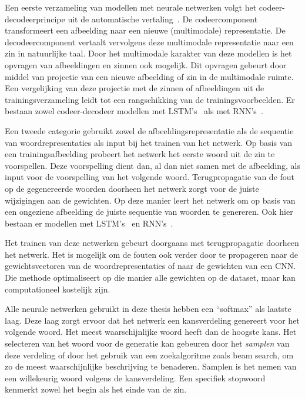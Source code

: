 Een eerste verzameling van modellen met neurale netwerken volgt het codeer-decodeerprincipe uit de automatische vertaling~\cite{Kiros2014}. De codeercomponent transformeert een afbeelding naar een nieuwe (multimodale) representatie. De decodeercomponent vertaalt vervolgens deze multimodale representatie naar een zin in natuurlijke taal. Door het multimodale karakter van deze modellen is het opvragen van afbeeldingen en zinnen ook mogelijk. Dit opvragen gebeurt door middel van projectie van een nieuwe afbeelding of zin in de multimodale ruimte. Een vergelijking van deze projectie met de zinnen of afbeeldingen uit de trainingsverzameling leidt tot een rangschikking van de trainingsvoorbeelden. Er bestaan zowel codeer-decodeer modellen met LSTM's~\cite{Kiros2014} als met RNN's~\cite{Karpathy2014,Mao2014a}.

Een tweede categorie gebruikt zowel de afbeeldingsrepresentatie als de sequentie van 
woordrepresentaties als input bij het trainen van het netwerk. Op basis van een trainingsafbeelding probeert het netwerk het eerste woord uit de zin te voorspellen. Deze voorspelling dient dan, al dan niet samen met de afbeelding, als input voor de voorspelling van het volgende woord. Terugpropagatie van de fout op de gegenereerde woorden doorheen het netwerk zorgt voor de juiste wijzigingen aan de gewichten. Op deze manier leert het netwerk om op basis van een ongeziene afbeelding de juiste sequentie van woorden te genereren. Ook hier bestaan er modellen met LSTM's~\cite{Donahue2015,Google,Xu2015} en RNN's~\cite{Karpathy2015,Mao2014a}.

Het trainen van deze netwerken gebeurt doorgaans met terugpropagatie doorheen het netwerk. Het is mogelijk om de fouten ook verder door te propageren naar de gewichtsvectoren van de woordrepresentaties of naar de gewichten van een CNN. Die methode optimaliseert op die manier alle gewichten op de dataset, maar kan computationeel kostelijk zijn.

Alle neurale netwerken gebruikt in deze thesis hebben een ``softmax'' als laatste laag. Deze laag zorgt ervoor dat het netwerk een kansverdeling genereert voor het volgende woord. Het meest waarschijnlijke woord heeft dan de hoogste kans.
Het selecteren van het woord voor de generatie kan gebeuren door het \emph{samplen} van deze verdeling of door het gebruik van een zoekalgoritme zoals beam search, om zo de meest waarschijnlijke beschrijving te benaderen. Samplen is het nemen van een willekeurig woord volgens de kansverdeling. Een specifiek stopwoord kenmerkt zowel het begin als het einde van de zin.

